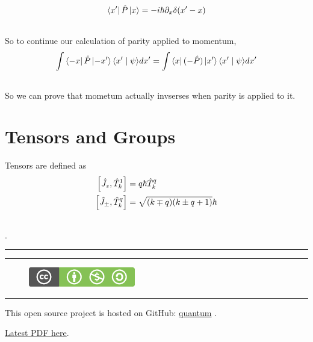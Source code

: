 \documentclass[letterpaper,10pt,english]{sphinxmanual}
\newcommand{\bra}[1]{\left\langle #1\right|}
\newcommand{\ket}[1]{\left| #1\right\rangle}
\newcommand{\braket}[2]{\langle #1 \mid #2 \rangle}
\begin{document}
\begin{enumerate}
\begin{gather}
\begin{split}\bra{x'}\hat P \ket{x} = -i\hbar \partial_x \delta(x'-x)\end{split}\notag\\\begin{split}\end{split}\notag
\end{gather}
So to continue our calculation of parity applied to momentum,
\begin{gather}
\begin{split}\int \bra{-x}\hat P \ket{-x'}\braket{x'}{\psi} d x' = \int \bra{x}(-\hat P)\ket{x'}\braket{x'}{\psi}dx'\end{split}\notag\\\begin{split}\end{split}\notag
\end{gather}
So we can prove that mometum actually invserses when parity is applied to it.

\end{enumerate}


\section{Tensors and Groups}
\label{tensors::doc}\label{tensors:tensors-and-groups}
Tensors are defined as
\begin{gather}
\begin{split}\left[\hat J_z, \hat T_k^1 \right] &= q\hbar \hat T_k^q \\
\left[ \hat J_{\pm}, \hat T_k^q \right] & = \sqrt{(k\mp q)(k\pm q + 1)}\hbar\end{split}\notag\\\begin{split}\end{split}\notag
\end{gather}
.


\bigskip\hrule{}\bigskip



\bigskip\hrule{}\bigskip

\begin{figure}[htbp]
\centering
\href{http://creativecommons.org/licenses/by-nc-sa/3.0/us/}{\includegraphics{cc_byncsa.png}}\end{figure}


\bigskip\hrule{}\bigskip


This open source project is hosted on GitHub: \href{https://github.com/emptymalei/quantum}{quantum} .

\href{https://raw.github.com/emptymalei/quantum/master/Notes/\_build/latex/quantum.pdf}{Latest PDF here}.



\renewcommand{\indexname}{Index}
\printindex
\end{document}
